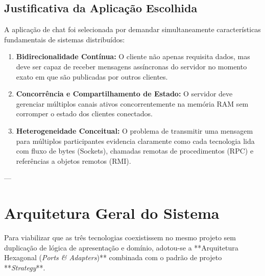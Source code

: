 \documentclass[12pt,a4paper]{article}
\begin{document}
\subsection{Justificativa da Aplicação Escolhida}
A aplicação de chat foi selecionada por demandar simultaneamente características fundamentais de sistemas distribuídos:
\begin{enumerate}
    \item \textbf{Bidirecionalidade Contínua:} O cliente não apenas requisita dados, mas deve ser capaz de receber mensagens assíncronas do servidor no momento exato em que são publicadas por outros clientes.
    \item \textbf{Concorrência e Compartilhamento de Estado:} O servidor deve gerenciar múltiplos canais ativos concorrentemente na memória RAM sem corromper o estado dos clientes conectados.
    \item \textbf{Heterogeneidade Conceitual:} O problema de transmitir uma mensagem para múltiplos participantes evidencia claramente como cada tecnologia lida com fluxo de bytes (Sockets), chamadas remotas de procedimentos (RPC) e referências a objetos remotos (RMI).
\end{enumerate}

---

\section{Arquitetura Geral do Sistema}

Para viabilizar que as três tecnologias coexistissem no mesmo projeto sem duplicação de lógica de apresentação e domínio, adotou-se a **Arquitetura Hexagonal (\textit{Ports \& Adapters})** combinada com o padrão de projeto **\textit{Strategy}**.
\end{document}
